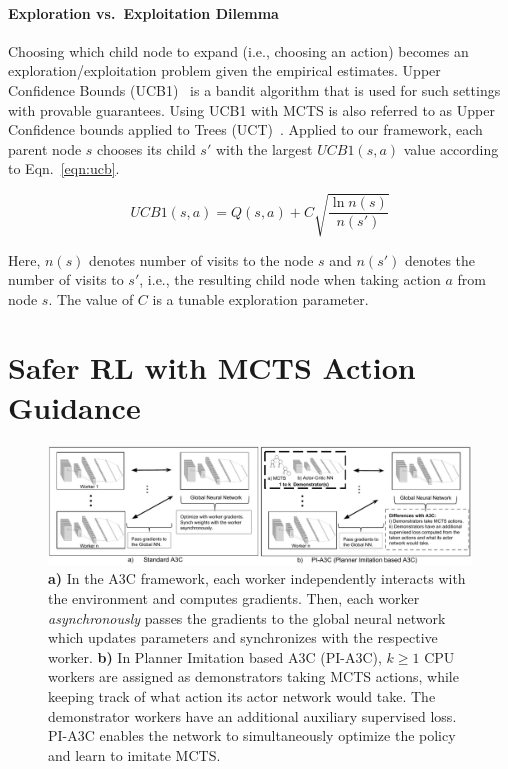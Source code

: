 \documentclass[letterpaper]{article} %
\begin{document}
\paragraph{Exploration vs.~Exploitation Dilemma}

Choosing which child node to expand (i.e., choosing an action) becomes an exploration/exploitation problem given the empirical estimates. Upper Confidence Bounds (UCB1)~\cite{auer2002finite} is a bandit algorithm that is used for such settings with provable guarantees. Using UCB1 with MCTS is also referred to as Upper Confidence bounds applied to Trees (UCT)~\cite{kocsis2006bandit}. Applied to our framework, each parent node $s$ chooses its child $s'$ with the largest $UCB1(s,a)$ value according to Eqn.~\ref{eqn:ucb}.

\begin{equation}
UCB1(s,a) = Q(s,a) + C \sqrt{\frac{\ln n(s)}{n(s')}}
\label{eqn:ucb}
\end{equation}

\noindent Here, $n(s)$ denotes number of visits to the node $s$ and $n(s')$ denotes the number of visits to $s'$, i.e., the resulting child node when taking action $a$ from node $s$. The value of $C$ is a tunable exploration parameter.



\section{Safer RL with MCTS Action Guidance}


\begin{figure}
\centering
\includegraphics[width=\linewidth]{A3C_PI-A3C.pdf}
\caption{\textbf{a)} In the A3C framework, each worker independently interacts with the environment and computes gradients. Then, each worker \emph{asynchronously} passes the gradients to the global neural network which updates parameters and synchronizes with the respective worker. \textbf{b)} In Planner Imitation based A3C (PI-A3C), $k\ge 1$ CPU workers are assigned as demonstrators taking MCTS actions, while keeping track of what action its actor network would take. The demonstrator workers have an additional auxiliary supervised loss. PI-A3C enables the network to simultaneously optimize the policy and learn to imitate MCTS.}
\label{fig:pi_a3c}
\end{figure}
\end{document}
